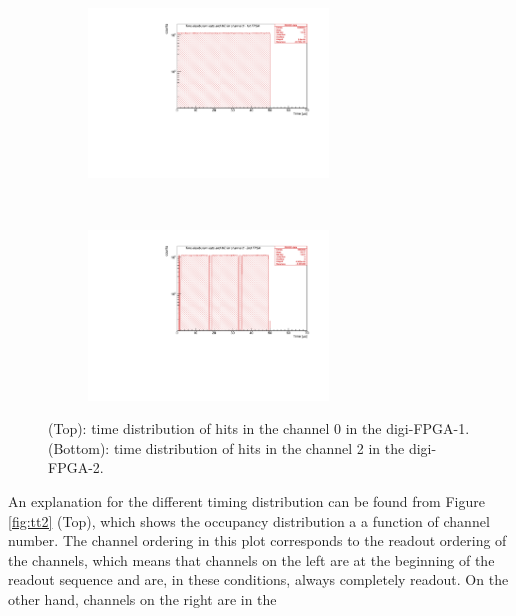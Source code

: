 \begin{figure}[!h]
  \begin{subfigure}[b]{\textwidth}
      \centering
      \includegraphics[width=0.7\textwidth]{figures/pdf/figure_00007_timedistr_roc_simulation_ch0_281.pdf}
      \label{fig:t1}
  \end{subfigure}
\\
  \begin{subfigure}[b]{\textwidth}
      \centering
      \includegraphics[width=0.7\textwidth]{figures/pdf/figure_00003_timedistr_roc_simulation_ch2_281.pdf}
      \label{fig:t2}
  \end{subfigure}
     \caption{(Top): time distribution of hits in the channel 0 in the digi-FPGA-1.
     (Bottom): time distribution of hits in the channel 2 in the digi-FPGA-2.}
     \label{fig:1}
\end{figure}
An explanation for the different timing distribution 
can be found from Figure \ref{fig:tt2} (Top), 
which shows the occupancy distribution a a function of channel number.
The channel ordering in this plot corresponds to the readout 
ordering of the channels, which means that channels on the 
left are at the beginning of the readout sequence and are, in these conditions, always 
completely readout. On the other hand, channels on the right are in the 

